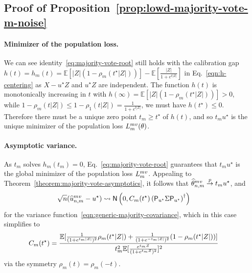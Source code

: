 \documentclass[11pt]{article}
\newcommand{\Ep}{\mathbb{E}}
\newcommand{\E}{\mathbb{E}}
\newcommand{\prn}[1]{\left({#1}\right)} %
\newcommand{\brk}[1]{\left[{#1}\right]} %
\newcommand{\what}[1]{\widehat{#1}}
\newcommand{\normal}{\mathsf{N}}
\newcommand{\lr}{^{\textup{lr}}}
\newcommand{\mv}{^{\textup{mv}}}
\newcommand{\proj}{\mathsf{P}}
\newcommand{\poploss}{L}
\newcommand{\<}{\langle} %
\renewcommand{\>}{\rangle}
\newcommand{\cd}{\rightsquigarrow}
\newcommand{\cp}{\stackrel{p}{\rightarrow}}
\newcommand{\opt}{^\star}
\begin{document}
\subsection{Proof of Proposition~\ref{prop:lowd-majority-vote-m-noise}}
\label{proof:lowd-majority-vote-m-noise}

\paragraph{Minimizer of the population loss.}
We can see identity~\eqref{eq:majority-vote-root} still holds with the
calibration gap $h(t) = h_m(t) = \E[|Z|(1 - \rho_m(t\opt |Z|))] -
\E[\frac{|Z|}{1 + e^{t|Z|}}]$ in Eq.~\eqref{eqn:h-centering} as $X-u\opt Z$
and $u\opt Z$ are independent. The function $h(t)$ is monotonically
increasing in $t$ with $h(\infty) =\Ep \brk{|Z|(1-\rho_m(t^\star |Z|))} >
0$, while $1 - \rho_m(t|Z|) \leq 1 - \rho_1(t|Z|) = \frac{1}{1 + e^{t|Z|}}$,
we must have $h(t^\star) \leq 0$. Therefore there must be a unique zero
point $t_m \ge t\opt$ of $h(t)$, and so $t_m u\opt$ is the unique minimizer
of the population loss $\poploss\mv_m(\theta)$.

\paragraph{Asymptotic variance.}
As $t_m$ solves $h_m(t_m) = 0$, 
Eq.~\eqref{eq:majority-vote-root} guarantees that $t_m u\opt$ is the global
minimizer of the population loss $\poploss\mv_m$. Appealing to
Theorem~\ref{theorem:majority-vote-asymptotics}, it follows that
$\what{\theta}\mv_{n,m} \cp t_m u\opt$, and
\begin{align*}
  \sqrt{n} (\what{u}\mv_{n,m} -  u^\star)&\cd \normal\left(0, \varfunc(t\opt)
  \prn{\proj_{u\opt} \Sigma \proj_{u\opt}}^\dagger\right)
\end{align*}
for the variance function~\eqref{eqn:generic-majority-covariance},
which in this case simplifies to
\begin{align*}
  \varfunc(t\opt)
  & = \frac{\Ep[\frac{1}{(1 + e^{t_m|Z|})^2} \rho_m(t\opt |Z|)
      + \frac{1}{(1 + e^{-t_m|Z|})^2} (1-\rho_m(t\opt |Z|)) ]}{
    t_m^2 \Ep[\frac{e^{t_m Z} }{ (1 + e^{t_m Z})^2}]^2}
\end{align*}
via the symmetry $\rho_m(t) = \rho_m(-t)$.
\end{document}
